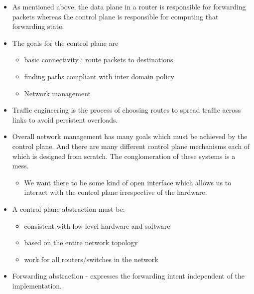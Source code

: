 \documentclass[]{article}
\providecommand{\tightlist}{%
  \setlength{\itemsep}{0pt}\setlength{\parskip}{0pt}}
\begin{document}
\begin{itemize}
\tightlist
\item
  As mentioned above, the data plane in a router is responsible for
  forwarding packets whereas the control plane is responsible for
  computing that forwarding state.
\item
  The goals for the control plane are

  \begin{itemize}
  \tightlist
  \item
    basic connectivity : route packets to destinations
  \item
    finding paths compliant with inter domain policy
  \item
    Network management
  \end{itemize}
\item
  Traffic engineering is the process of choosing routes to spread
  traffic across links to avoid persistent overloads.
\item
  Overall network management has many goals which must be achieved by
  the control plane. And there are many different control plane
  mechanisms each of which is designed from scratch. The conglomeration
  of these systems is a mess.

  \begin{itemize}
  \tightlist
  \item
    We want there to be some kind of open interface which allows us to
    interact with the control plane irrespective of the hardware.
  \end{itemize}
\item
  A control plane abstraction must be:

  \begin{itemize}
  \tightlist
  \item
    consistent with low level hardware and software
  \item
    based on the entire network topology
  \item
    work for all routers/switches in the network
  \end{itemize}
\item
  Forwarding abstraction - expresses the forwarding intent independent
  of the implementation.


\end{itemize}
\end{document}
